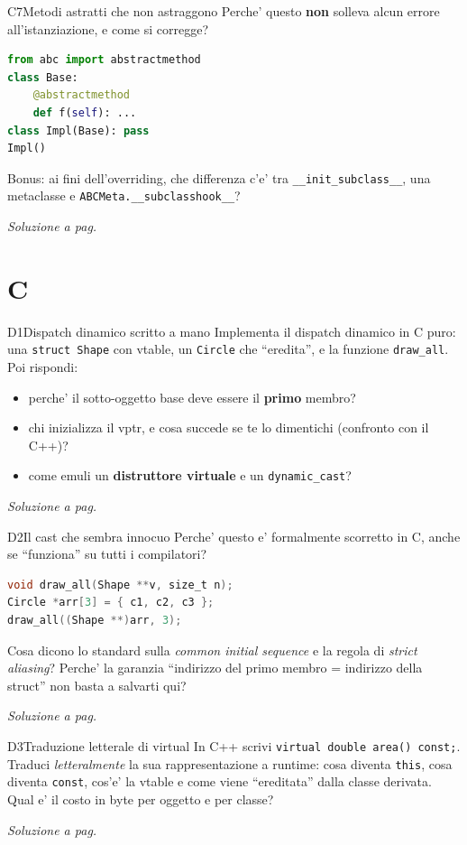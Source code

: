 \documentclass{report}
\newcommand{\code}[1]{\texttt{\small #1}}
\newcommand{\dunder}[1]{\texttt{\small \_\_#1\_\_}}
\newcommand{\vaisol}[1]{%
    \par\vspace{4pt}\hfill{\footnotesize\itshape\color{gray}%
    Soluzione a pag.~\pageref{sol:#1}}%
}
\begin{document}
\begin{domanda}{C7}{Metodi astratti che non astraggono}
Perche' questo \textbf{non} solleva alcun errore all'istanziazione, e come si
corregge?
\begin{lstlisting}[language=Python]
from abc import abstractmethod
class Base:
    @abstractmethod
    def f(self): ...
class Impl(Base): pass
Impl()
\end{lstlisting}
Bonus: ai fini dell'overriding, che differenza c'e' tra \dunder{init\_subclass},
una metaclasse e \code{ABCMeta.\_\_subclasshook\_\_}?
\vaisol{C7}
\end{domanda}

\chapter{C}\label{ch:c}

\begin{domanda}{D1}{Dispatch dinamico scritto a mano}
Implementa il dispatch dinamico in C puro: una \code{struct Shape} con vtable,
un \code{Circle} che ``eredita'', e la funzione \code{draw\_all}. Poi rispondi:
\begin{itemize}
    \item perche' il sotto-oggetto base deve essere il \textbf{primo} membro?
    \item chi inizializza il vptr, e cosa succede se te lo dimentichi
          (confronto con il C++)?
    \item come emuli un \textbf{distruttore virtuale} e un \code{dynamic\_cast}?
\end{itemize}
\vaisol{D1}
\end{domanda}

\begin{domanda}{D2}{Il cast che sembra innocuo}
Perche' questo e' formalmente scorretto in C, anche se ``funziona'' su tutti i
compilatori?
\begin{lstlisting}[language=C]
void draw_all(Shape **v, size_t n);
Circle *arr[3] = { c1, c2, c3 };
draw_all((Shape **)arr, 3);
\end{lstlisting}
Cosa dicono lo standard sulla \emph{common initial sequence} e la regola di
\emph{strict aliasing}? Perche' la garanzia ``indirizzo del primo membro =
indirizzo della struct'' non basta a salvarti qui?
\vaisol{D2}
\end{domanda}

\begin{domanda}{D3}{Traduzione letterale di virtual}
In C++ scrivi \code{virtual double area() const;}. Traduci \emph{letteralmente}
la sua rappresentazione a runtime: cosa diventa \code{this}, cosa diventa
\code{const}, cos'e' la vtable e come viene ``ereditata'' dalla classe
derivata. Qual e' il costo in byte per oggetto e per classe?
\vaisol{D3}
\end{domanda}
\end{document}
